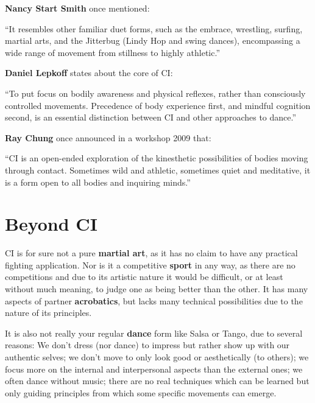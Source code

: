 \textbf{Nancy Start Smith} once mentioned:
\begin{displayquote}
	``It resembles other familiar duet forms, such as the embrace, wrestling, surfing, martial arts, and the Jitterbug (Lindy Hop and swing dances), encompassing a wide range of movement from stillness to highly athletic.''
\end{displayquote}

\textbf{Daniel Lepkoff} states about the core of CI:
\begin{displayquote}
	``To put focus on bodily awareness and physical reflexes, rather than consciously controlled movements.
	Precedence of body experience first, and mindful cognition second, is an essential distinction between CI and other approaches to dance.''
\end{displayquote}

\textbf{Ray Chung} once announced in a workshop 2009 that:
\begin{displayquote}
	``CI is an open-ended exploration of the kinesthetic possibilities of bodies moving through contact.
	Sometimes wild and athletic, sometimes quiet and meditative, it is a form open to all bodies and inquiring minds.''
\end{displayquote}

\section{Beyond CI}\label{sec:beyond-ci}

CI is for sure not a pure \textbf{martial art}, as it has no claim to have any practical fighting application.
Nor is it a competitive \textbf{sport} in any way, as there are no competitions and due to its artistic nature it would be difficult, or at least without much meaning, to judge one as being better than the other.
It has many aspects of partner \textbf{acrobatics}, but lacks many technical possibilities due to the nature of its principles.

It is also not really your regular \textbf{dance} form like Salsa or Tango, due to several reasons: We don't dress (nor dance) to impress but rather show up with our authentic selves; we don't move to only look good or aesthetically (to others); we focus more on the internal and interpersonal aspects than the external ones; we often dance without music; there are no real techniques which can be learned but only guiding principles from which some specific movements can emerge.

